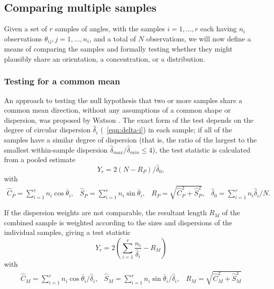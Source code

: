\documentclass[../../ArchStats.tex]{subfiles}
\begin{document}
\subsection{Comparing multiple samples}
\label{sec:similarity-tests}

Given a set of $r$  samples of angles, with the samples $i = 1, \dots, r$ each having $n_i$ observations $\theta_{ij}, j = 1, \dots, n_i$, and a total of $N$ observations, we will now define a means of comparing the samples and formally testing whether they might plausibly share an orientation, a concentration, or a distribution. 

\subsubsection{Testing for a common mean}
\label{sec:common-mean-test}

An approach to testing the null hypothesis that two or more samples share a common mean direction, without any assumptions of a common shape or dispersion, was proposed by Watson \cite{Watson1983}. The exact form of the test depends on the degree of circular dispersion $\hat{\delta}_i$ (~\ref{eqn:delta-i}) in each sample; if all of the samples have a similar degree of dispersion (that is, the ratio of the largest to the smallest within-sample dispersion $\hat{\delta}_{max} / \hat{\delta}_{min} \leq 4$), the test statistic is calculated from a pooled estimate
\begin{equation}
Y_r = 2(N - R_P) / \hat{\delta}_0,
\end{equation}
with
\begin{equation}
\begin{matrix*}
\hat{C}_P = \sum_{i=1}^r n_i \cos \bar{\theta}_i, &
\hat{S}_P = \sum_{i=1}^r n_i \sin \bar{\theta}_i, &
R_P = \sqrt{\hat{C}_P^2 + \hat{S}_P^2}, &
\hat{\delta}_0 = \sum_{i=1}^r n_i \hat{\delta}_i / N.
\end{matrix*}
\end{equation}


If the dispersion weights are not comparable, the resultant length $R_M$ of the combined sample is weighted according to the sizes and dispersions of the individual samples, giving a test statistic
\begin{equation}
Y_r = 2\left(\sum_{i=1}^r \frac{n_i}{\hat{\delta}_i} - R_M\right)
\end{equation}
with 
\begin{equation}
\begin{matrix*}
\hat{C}_M = \sum_{i=1}^r n_i \cos \bar{\theta}_i / \hat{\delta}_i, &
\hat{S}_M = \sum_{i=1}^r n_i \sin \bar{\theta}_i / \hat{\delta}_i, &
R_M = \sqrt{\hat{C}_M^2 + \hat{S}_M^2}
\end{matrix*}
\end{equation}
\end{document}
